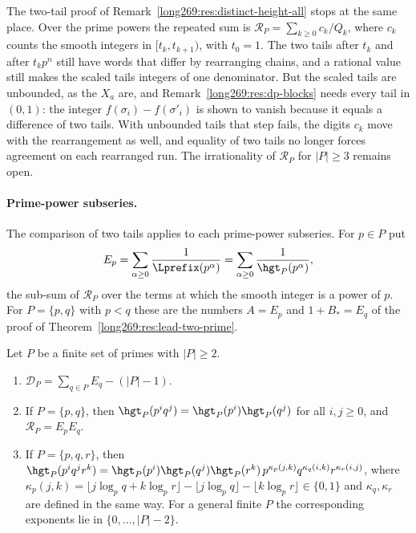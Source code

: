 The two-tail proof of Remark~\ref{long269:res:distinct-height-all} stops
at the same place.  Over the prime powers the repeated sum is
$\mathcal R_P=\sum_{k\ge0}c_k/Q_k$, where $c_k$ counts the smooth integers
in $[t_k,t_{k+1})$, with $t_0=1$.  The two tails after $t_k$ and after
$t_kp^n$ still have words that differ by rearranging chains, and a rational
value still makes the scaled tails integers of one denominator.  But the
scaled tails are unbounded, as the $X_a$ are, and
Remark~\ref{long269:res:dp-blocks} needs every tail in $(0,1)$: the integer
$f(\sigma_i)-f(\sigma'_i)$ is shown to vanish because it equals a
difference of two tails.  With unbounded tails that step fails, the digits
$c_k$ move with the rearrangement as well, and equality of two tails no
longer forces agreement on each rearranged run.  The irrationality of
$\mathcal R_P$ for $|P|\ge3$ remains open.

\paragraph{Prime-power subseries.}
The comparison of two tails applies to each prime-power subseries.
For $p\in P$ put
\[
 E_p=\sum_{\alpha\ge0}\frac1{\Lprefix(p^\alpha)}=\sum_{\alpha\ge0}\frac1{\hgt_P(p^\alpha)},
\]
the sub-sum of $\mathcal R_P$ over the terms at which the smooth integer is
a power of $p$.  For $P=\{p,q\}$ with $p<q$ these are the numbers $A=E_p$
and $1+B_\ast=E_q$ of the proof of Theorem~\ref{long269:res:lead-two-prime}.

\begin{remark}\label{long269:res:single-prime-identities}
Let $P$ be a finite set of primes with $|P|\ge2$.
\begin{enumerate}[label=\textup{(\roman*)}]
\item $\mathcal D_P=\sum_{q\in P}E_q-(|P|-1)$.
\item If $P=\{p,q\}$, then $\hgt_P(p^iq^j)=\hgt_P(p^i)\hgt_P(q^j)$ for all
$i,j\ge0$, and $\mathcal R_P=E_pE_q$.
\item If $P=\{p,q,r\}$, then
$\hgt_P(p^iq^jr^k)=\hgt_P(p^i)\hgt_P(q^j)\hgt_P(r^k)\,
p^{\kappa_p(j,k)}q^{\kappa_q(i,k)}r^{\kappa_r(i,j)}$, where
$\kappa_p(j,k)=\lfloor j\log_pq+k\log_pr\rfloor-\lfloor j\log_pq\rfloor-\lfloor
k\log_pr\rfloor\in\{0,1\}$ and $\kappa_q,\kappa_r$ are defined in the same
way.  For a general finite $P$ the corresponding exponents lie in
$\{0,\ldots,|P|-2\}$.
\end{enumerate}
\end{remark}


